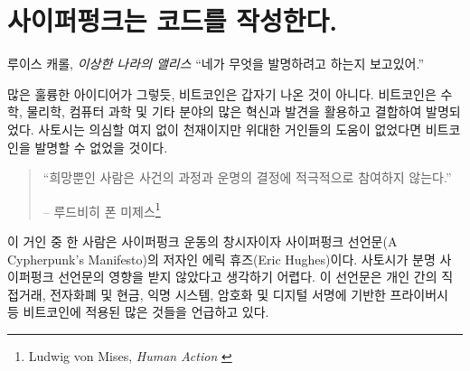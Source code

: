 \chapter{사이퍼펑크는 코드를 작성한다.}
\label{les:20}

\begin{chapquote}
{루이스 캐롤, \textit{이상한 나라의 앨리스}}
\enquote{네가 무엇을 발명하려고 하는지 보고있어.}
\end{chapquote}

\begin{comment}
Like many great ideas, Bitcoin didn't come out of nowhere. It was made
possible by utilizing and combining many innovations and discoveries in
mathematics, physics, computer science, and other fields. While
undoubtedly a genius, Satoshi wouldn't have been able to invent Bitcoin
without the giants on whose shoulders he was standing on.
\end{comment}
많은 훌륭한 아이디어가 그렇듯, 
비트코인은 갑자기 나온 것이 아니다.
비트코인은 수학, 물리학, 컴퓨터 과학 및 기타 분야의 많은 혁신과 발견을 활용하고 결합하여 발명되었다.
사토시는 의심할 여지 없이 천재이지만 위대한 거인들의 도움이 없었다면 비트코인을 발명할 수 없었을 것이다.

\begin{quotation}\begin{samepage}
\enquote{희망뿐인 사람은 사건의 과정과 운명의 결정에 적극적으로 참여하지 않는다.}
\begin{flushright} -- 루드비히 폰 미제스\footnote{Ludwig von Mises, \textit{Human Action} \cite{human-action}}
\end{flushright}\end{samepage}\end{quotation}

\begin{comment}
One of these giants is Eric Hughes, one of the founders of the cypherpunk
movement and author of \textit{A Cypherpunk's Manifesto}. It's hard to imagine
that Satoshi wasn't influenced by this manifesto. It speaks of many things which
Bitcoin enables and utilizes, such as direct and private transactions,
electronic money and cash, anonymous systems, and defending privacy with
cryptography and digital signatures.
\end{comment}
이 거인 중 한 사람은 사이퍼펑크 운동의 창시자이자 사이퍼펑크 선언문(A Cypherpunk's Manifesto)의 저자인 
에릭 휴즈(Eric Hughes)이다.
사토시가 분명 사이퍼펑크 선언문의 영향을 받지 않았다고 생각하기 어렵다.
이 선언문은 개인 간의 직접거래, 전자화폐 및 현금, 익명 시스템, 암호화 및 디지털 서명에 기반한 프라이버시 등 
비트코인에 적용된 많은 것들을 언급하고 있다.

